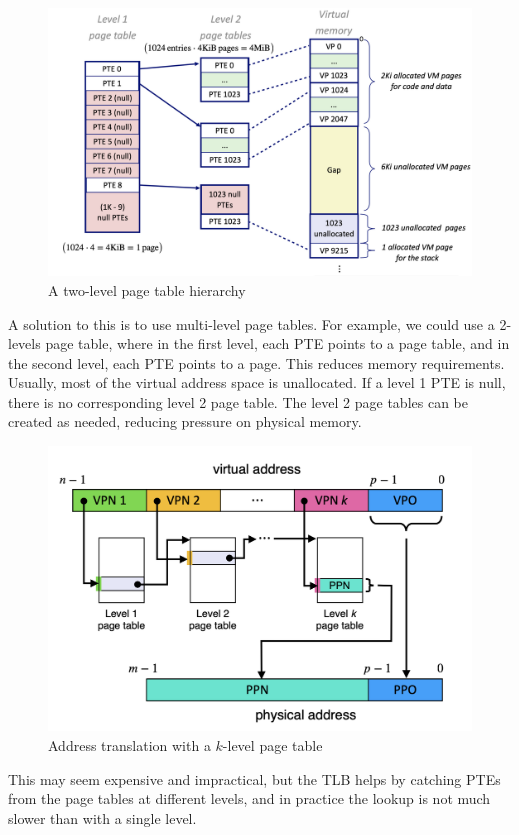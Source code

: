 \documentclass[toc]{../cs-classes/cs-classes}
\begin{document}
\begin{figure}[H]
    \centering
    \includegraphics[scale=0.35]{images/2-level-PT.png}
    \caption{A two-level page table hierarchy}
\end{figure}
A solution to this is to use multi-level page tables. For example, we could use a 2-levels page table, where in the first level, each PTE points to a page table, and in the second level, each PTE points to a page. This reduces memory requirements. Usually, most of the virtual address space is unallocated. If a level 1 PTE is null, there is no corresponding level 2 page table. The level 2 page tables can be created as needed, reducing pressure on physical memory.

\begin{figure}[H]
    \centering
    \includegraphics[scale=0.4]{images/translation-k-level.png}
    \caption{Address translation with a $k$-level page table}
\end{figure}
This may seem expensive and impractical, but the TLB helps by catching PTEs from the page tables at different levels, and in practice the lookup is not much slower than with a single level.
\end{document}
